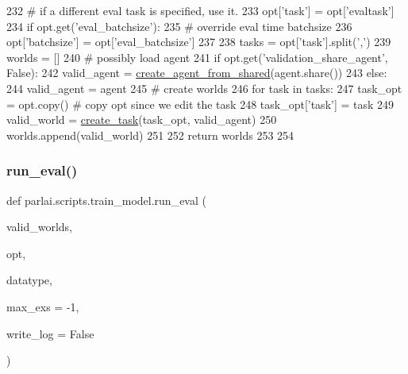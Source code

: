 \begin{DoxyCode}
232         \textcolor{comment}{# if a different eval task is specified, use it.}
233         opt[\textcolor{stringliteral}{'task'}] = opt[\textcolor{stringliteral}{'evaltask'}]
234     \textcolor{keywordflow}{if} opt.get(\textcolor{stringliteral}{'eval\_batchsize'}):
235         \textcolor{comment}{# override eval time batchsize}
236         opt[\textcolor{stringliteral}{'batchsize'}] = opt[\textcolor{stringliteral}{'eval\_batchsize'}]
237 
238     tasks = opt[\textcolor{stringliteral}{'task'}].split(\textcolor{stringliteral}{','})
239     worlds = []
240     \textcolor{comment}{# possibly load agent}
241     \textcolor{keywordflow}{if} opt.get(\textcolor{stringliteral}{'validation\_share\_agent'}, \textcolor{keyword}{False}):
242         valid\_agent = \hyperlink{namespaceparlai_1_1core_1_1agents_aa5af5dd1d2f9da491b60348d479b849f}{create\_agent\_from\_shared}(agent.share())
243     \textcolor{keywordflow}{else}:
244         valid\_agent = agent
245     \textcolor{comment}{# create worlds}
246     \textcolor{keywordflow}{for} task \textcolor{keywordflow}{in} tasks:
247         task\_opt = opt.copy()  \textcolor{comment}{# copy opt since we edit the task}
248         task\_opt[\textcolor{stringliteral}{'task'}] = task
249         valid\_world = \hyperlink{namespaceparlai_1_1core_1_1worlds_a11923c10b545c7ecc1b08fe2242d9c2c}{create\_task}(task\_opt, valid\_agent)
250         worlds.append(valid\_world)
251 
252     \textcolor{keywordflow}{return} worlds
253 
254 
\end{DoxyCode}
\mbox{\label{namespaceparlai_1_1scripts_1_1train__model_a496dfe3bf04da9b55d261b4c8d6229a7}} 
\subsubsection{\texorpdfstring{run\+\_\+eval()}{run\_eval()}}
{\footnotesize\ttfamily def parlai.\+scripts.\+train\+\_\+model.\+run\+\_\+eval (\begin{DoxyParamCaption}\item[{}]{valid\+\_\+worlds,  }\item[{}]{opt,  }\item[{}]{datatype,  }\item[{}]{max\+\_\+exs = {\ttfamily -\/1},  }\item[{}]{write\+\_\+log = {\ttfamily False} }\end{DoxyParamCaption})}

